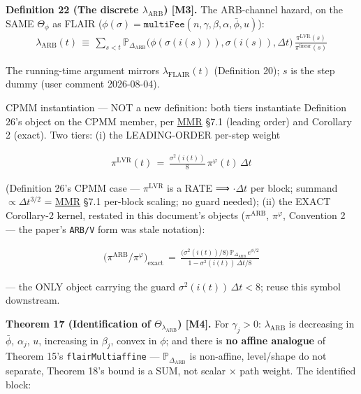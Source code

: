 \documentclass[11pt]{article}
\renewcommand{\_}{\textunderscore\allowbreak}
\begin{document}
\textbf{Definition 22 (The discrete \(\lambda_{\text{ARB}}\)) {[}M3{]}.} The ARB-channel hazard, on the SAME \(\Theta_{\phi}\) as FLAIR (\(\phi(\sigma) = \texttt{multiFee}(n,\gamma,\beta,\alpha,\bar\phi,u)\)): \[
    \begin{aligned}
        \lambda_{\text{ARB}}(t) \, \equiv \, \sum_{s<t} \mathbb{P}_{\Delta_{\text{ARB}}}\big(\phi(\sigma(i(s))),\sigma(i(s)),\Delta t\big)\,\frac{\pi^{\mathrm{LVR}}(s)}{\pi^{\text{linear}}(s)}
    \end{aligned}
\]

The running-time argument mirrors \(\lambda_{\text{FLAIR}}(t)\) (Definition 20); \(s\) is the step dummy (user comment 2026-08-04).

CPMM instantiation --- NOT a new definition: both tiers instantiate Definition 26's object on the CPMM member, per \href{../refs/mev/MilionisMoallemiRoughgardenArbProfitsFees.pdf}{MMR} §7.1 (leading order) and Corollary 2 (exact). Two tiers: (i) the LEADING-ORDER per-step weight

\[
    \begin{aligned}
        \pi^{\mathrm{LVR}}(t) \, = \, \frac{\sigma^2(i(t))}{8}\,\pi^{\varphi}(t)\,\Delta t
    \end{aligned}
\]

(Definition 26's CPMM case --- \(\pi^{\mathrm{LVR}}\) is a RATE ⟹ \(\cdot\Delta t\) per block; summand \(\propto \Delta t^{3/2}\) = \href{../refs/mev/MilionisMoallemiRoughgardenArbProfitsFees.pdf}{MMR} §7.1 per-block scaling; no guard needed); (ii) the EXACT Corollary-2 kernel, restated in this document's objects (\(\pi^{\text{ARB}}\), \(\pi^{\varphi}\), Convention 2 --- the paper's \texttt{ARB/V} form was stale notation):

\[
    \begin{aligned}
        \big(\pi^{\text{ARB}}/\pi^{\varphi}\big)_{\text{exact}} \, = \, \frac{\big(\sigma^2(i(t))/8\big)\,\mathbb{P}_{\Delta_{\text{ARB}}}\,e^{\phi/2}}{1-\sigma^2(i(t))\,\Delta t/8}
    \end{aligned}
\]

--- the ONLY object carrying the guard \(\sigma^2(i(t))\,\Delta t < 8\); reuse this symbol downstream.

\textbf{Theorem 17 (Identification of \(\Theta_{\lambda_{\text{ARB}}}\)) {[}M4{]}.} For \(\gamma_j > 0\): \(\lambda_{\text{ARB}}\) is decreasing in \(\bar\phi\), \(\alpha_j\), \(u\), increasing in \(\beta_j\), convex in \(\phi\); and there is \textbf{no affine analogue} of Theorem 15's \texttt{flairMulti\_affine} --- \(\mathbb{P}_{\Delta_{\text{ARB}}}\) is non-affine, level/shape do not separate, Theorem 18's bound is a SUM, not scalar × path weight. The identified block:
\end{document}
